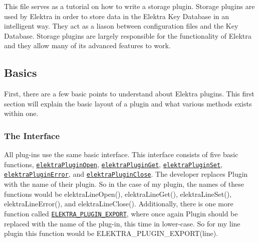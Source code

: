 This file serves as a tutorial on how to write a storage plugin. Storage plugins are used by Elektra in order to store data in the Elektra Key Database in an intelligent way. They act as a liason between configuration files and the Key Database. Storage plugins are largely responsible for the functionality of Elektra and they allow many of its advanced features to work.

\subsection*{Basics}

First, there are a few basic points to understand about Elektra plugins. This first section will explain the basic layout of a plugin and what various methods exists within one.

\subsubsection*{The Interface}

All plug-\/ins use the same basic interface. This interface consists of five basic functions, \href{http://doc.libelektra.org/api/current/html/group__plugin.html#ga1a72ac76b618943677e00ed7ab50b372}{\tt elektra\+Plugin\+Open}, \href{http://doc.libelektra.org/api/current/html/group__plugin.html#ga2f14a12b205687a31e6fd0645470ec69}{\tt elektra\+Plugin\+Get}, \href{http://doc.libelektra.org/api/current/html/group__plugin.html#ga01dd4018e48c3a091cb03940a7a8341f}{\tt elektra\+Plugin\+Set}, \href{http://doc.libelektra.org/api/current/html/group__plugin.html#gab0f8a88ee9868fb698b4e3040a70e000}{\tt elektra\+Plugin\+Error}, and \href{http://doc.libelektra.org/api/current/html/group__plugin.html#gaed8aeda2b2beab1b8052f8a64c601754}{\tt elektra\+Plugin\+Close}. The developer replaces {\ttfamily Plugin} with the name of their plugin. So in the case of my plugin, the names of these functions would be {\ttfamily elektra\+Line\+Open()}, {\ttfamily elektra\+Line\+Get()}, {\ttfamily elektra\+Line\+Set()}, {\ttfamily elektra\+Line\+Error()}, and {\ttfamily elektra\+Line\+Close()}. Additionally, there is one more function called \href{http://doc.libelektra.org/api/current/html/group__plugin.html#gabe78724d2d477eef39997fd9b85bff16}{\tt E\+L\+E\+K\+T\+R\+A\+\_\+\+P\+L\+U\+G\+I\+N\+\_\+\+E\+X\+P\+O\+R\+T}, where once again {\ttfamily Plugin} should be replaced with the name of the plug-\/in, this time in lower-\/case. So for my line plugin this function would be {\ttfamily E\+L\+E\+K\+T\+R\+A\+\_\+\+P\+L\+U\+G\+I\+N\+\_\+\+E\+X\+P\+O\+R\+T(line)}.

